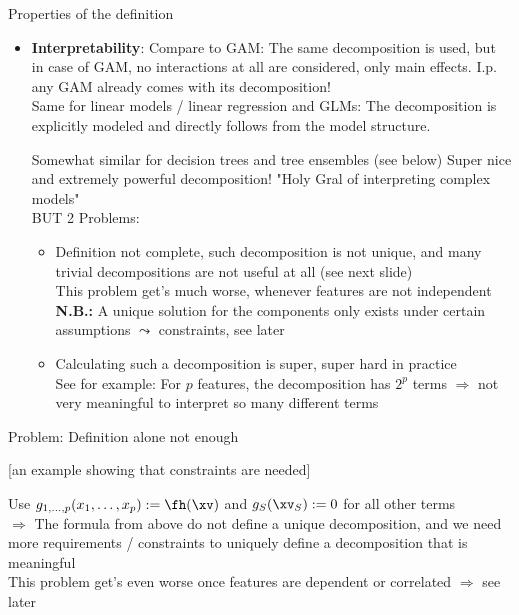\documentclass[11pt,compress,t,notes=noshow, aspectratio=169, xcolor=table]{beamer}
\begin{document}
\begin{frame}{Properties of the definition}
\begin{itemize}
    \item \textbf{Interpretability}:
    Compare to GAM: The same decomposition is used, but in case of GAM, no interactions at all are considered, only main effects. I.p. any GAM already comes with its decomposition! \\
    Same for linear models / linear regression and GLMs: The decomposition is explicitly modeled and directly follows from the model structure.

    Somewhat similar for decision trees and tree ensembles (see below)
    Super nice and extremely powerful decomposition! "Holy Gral of interpreting complex models"\\
    BUT 2 Problems:
    \begin{itemize}
        \item Definition not complete, such decomposition is not unique, and many trivial decompositions are not useful at all (see next slide) \\
            This problem get's much worse, whenever features are not independent \\
        \textbf{N.B.:} %
        A unique solution for the components only exists under certain assumptions $\leadsto$ constraints, see later
        \item Calculating such a decomposition is super, super hard in practice \\
            See for example: For \(p\) features, the decomposition has \(2^p\) terms \(\Rightarrow\) not very meaningful to interpret so many different terms \\
    \end{itemize}
\end{itemize}
\end{frame}

\begin{frame}{Problem: Definition alone not enough}

    [an example showing that constraints are needed]

    Use $g_{1, \dots, p}(x_1, \dots, x_p) := \fh(\xv)$ and $g_S(\xv_S) := 0$ for all other terms
    \\
    \(\Rightarrow\) The formula from above do not define a unique decomposition, and we need more requirements / constraints to uniquely define a decomposition that is meaningful
    \\
    This problem get's even worse once features are dependent or correlated \(\Rightarrow\) see later
    
\end{frame}
\end{document}
